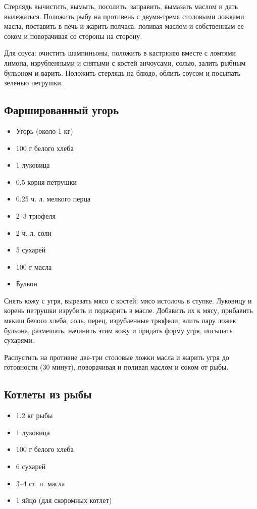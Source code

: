 Стерлядь вычистить, вымыть, посолить, заправить, вымазать маслом и дать вылежаться. Положить рыбу на противень с двумя-тремя столовыми ложками масла, поставить в печь и жарить полчаса, поливая маслом и собственным ее соком и поворачивая со стороны на сторону.

Для соуса: очистить шампиньоны, положить в кастрюлю вместе с ломтями лимона, изрубленными и снятыми с костей анчоусами, солью, залить рыбным бульоном и варить. Положить стерлядь на блюдо, облить соусом и посыпать зеленью петрушки.

\subsection{Фаршированный угорь}

\begin{itemize} 
	\item  Угорь (около 1 кг) 
    \item  100 г белого хлеба 
    \item  1 луковица 
    \item  0.5 корня петрушки 
    \item  0.25 ч. л. мелкого перца 
    \item  2–3 трюфеля 
    \item  2 ч. л. соли 
    \item  5 сухарей 
    \item  100 г масла 
    \item  Бульон
\end{itemize}

Снять кожу с угря, вырезать мясо с костей; мясо истолочь в ступке. Луковицу и корень петрушки изрубить и поджарить в масле. Добавить их к мясу, прибавить мякиш белого хлеба, соль, перец, изрубленные трюфели, влить пару ложек бульона, размешать, начинить этим кожу и придать форму угря, посыпать сухарями.

Распустить на противне две-три столовые ложки масла и жарить угря до готовности (30 минут), поворачивая и поливая маслом и соком от рыбы.

\subsection{Котлеты из рыбы}\label{27kotlety-ryby}

\begin{itemize} 
	\item  1.2 кг рыбы 
    \item  1 луковица 
    \item  100 г белого хлеба 
    \item  6 сухарей 
    \item  3–4 ст. л. масла 
    \item  1 яйцо (для скоромных котлет)
\end{itemize}

